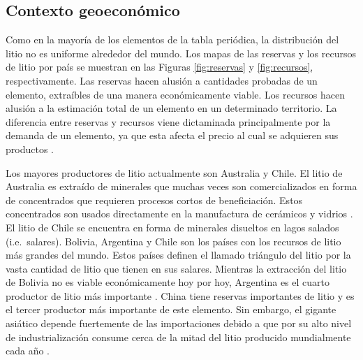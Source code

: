 \subsection{Contexto geoeconómico}
Como en la mayoría de los elementos de la tabla periódica, la distribución del litio no es uniforme alrededor del mundo. Los mapas de las reservas y los recursos de litio por país se muestran en las Figuras \ref{fig:reservas} y \ref{fig:recursos}, respectivamente. Las reservas hacen alusión a cantidades probadas de un elemento, extraíbles de una manera económicamente viable. Los recursos hacen alusión a la estimación total de un elemento en un determinado territorio. La diferencia entre reservas y recursos viene dictaminada principalmente por la demanda de un elemento, ya que esta afecta el precio al cual se adquieren sus productos \citep{VIKSTROM2013}. 

Los mayores productores de litio actualmente son Australia y Chile. El litio de Australia es extraído de minerales que muchas veces son comercializados en forma de concentrados que requieren procesos cortos de beneficiación. Estos concentrados son usados directamente en la manufactura de cerámicos y vidrios \citep{Bradley2017}. El litio de Chile se encuentra en forma de minerales disueltos en lagos salados (i.e.\ salares).  Bolivia, Argentina y Chile son los países con los recursos de litio más grandes del mundo. Estos países definen el llamado {triángulo del litio} por la vasta cantidad de litio que tienen en sus salares. Mientras la extracción del litio de Bolivia no es viable económicamente hoy por hoy, Argentina es el cuarto productor de litio más importante \citep{USGS2020}. China tiene reservas importantes de litio y es el tercer productor más importante de este elemento. Sin embargo, el gigante asiático depende fuertemente de las importaciones debido a que por su alto nivel de industrialización consume cerca de la mitad del litio producido mundialmente cada año \citep{Olivetti2017}. 

